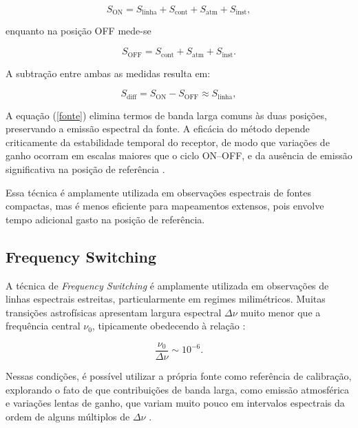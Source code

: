 \begin{equation}
S_{\mathrm{ON}} = S_{\mathrm{linha}} + S_{\mathrm{cont}} + S_{\mathrm{atm}} + S_{\mathrm{inst}},
\end{equation}

enquanto na posição OFF mede-se

\begin{equation}
S_{\mathrm{OFF}} = S_{\mathrm{cont}} + S_{\mathrm{atm}} + S_{\mathrm{inst}}.
\end{equation}

A subtração entre ambas as medidas resulta em:

\begin{equation}
S_{\mathrm{diff}} = S_{\mathrm{ON}} - S_{\mathrm{OFF}} \approx S_{\mathrm{linha}},
\label{fonte}
\end{equation}

A equação (\ref{fonte}) elimina termos de banda larga comuns às duas posições, preservando a emissão espectral da fonte. A eficácia do método depende criticamente da estabilidade temporal do receptor, de modo que variações de ganho ocorram em escalas maiores que o ciclo ON--OFF, e da ausência de emissão significativa na posição de referência \cite{wilson2013tools}.

Essa técnica é amplamente utilizada em observações espectrais de fontes compactas, mas é menos eficiente para mapeamentos extensos, pois envolve tempo adicional gasto na posição de referência.


\subsection{Frequency Switching}

A técnica de \textit{Frequency Switching} é amplamente utilizada em observações de linhas espectrais estreitas, particularmente em regimes milimétricos. Muitas transições astrofísicas apresentam largura espectral $\Delta \nu$ muito menor que a frequência central $\nu_0$, tipicamente obedecendo à relação \cite{GBTog2011_green}:

\begin{equation}
\frac{\nu_0}{\Delta \nu} \sim 10^{-6}.
\end{equation}

Nessas condições, é possível utilizar a própria fonte como referência de calibração, explorando o fato de que contribuições de banda larga, como emissão atmosférica e variações lentas de ganho, que variam muito pouco em intervalos espectrais da ordem de alguns múltiplos de $\Delta \nu$ \cite{GBTog2011_green}.

